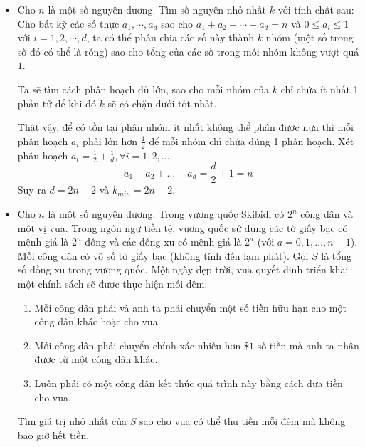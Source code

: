 \documentclass[11pt]{scrartcl}
\begin{document}
\begin{itemize}[label=, leftmargin=0em, itemsep=0.5em]
\newpage
    \item \begin{bt}
        Cho $n$ là một số nguyên dương. Tìm số nguyên nhỏ nhất $k$ với tính chất sau: Cho bất kỳ các số thực $a_1 , \cdots , a_d $ sao cho $a_1 + a_2 + \cdots + a_d = n$ và $0 \le a_i \le 1$ với $i=1,2,\cdots ,d$, ta có thể phân chia các số này thành $k$ nhóm (một số trong số đó có thể là rỗng) sao cho tổng của các số trong mỗi nhóm không vượt quá $1$.
    \end{bt}
    \begin{sol}
        Ta sẽ tìm cách phân hoạch đủ lớn, sao cho mỗi nhóm của $k$ chỉ chứa ít nhất 1 phần tử để khi đó $k$ sẽ có chặn dưới tốt nhất. 
        
        Thật vậy, để có tồn tại phân nhóm ít nhất không thể phân được nữa thì mỗi phân hoạch $a_i$ phải lớn hơn $\frac{1}{2}$ để mỗi nhóm chỉ chứa đúng 1 phân hoạch.  Xét phân hoạch $a_i = \frac{1}{2} + \frac{1}{d}, \forall i = 1,2,\dots$.
        \[
        a_1 + a_2 + \dots + a_d = \frac{d}{2} + 1 = n
        \]
        Suy ra $d = 2n - 2$ và $k_{min} = 2n - 2$.
    \end{sol}

    
    \item\begin{bt}
        Cho $n$ là một số nguyên dương. Trong vương quốc Skibidi có $2^n$ công dân và một vị vua. Trong ngôn ngữ tiền tệ, vương quốc sử dụng các tờ giấy bạc có mệnh giá là $2^n$ đồng và các đồng xu có mệnh giá là $2^a$ (với $a=0,1,\ldots,n-1$). Mỗi công dân có vô số tờ giấy bạc (không tính đến lạm phát). Gọi $S$ là tổng số đồng xu trong vương quốc. Một ngày đẹp trời, vua quyết định triển khai một chính sách sẽ được thực hiện mỗi đêm:
        \begin{enumerate}
            \item Mỗi công dân phải và anh ta phải chuyển một số tiền hữu hạn cho một công dân khác hoặc cho vua.
            \item Mỗi công dân phải chuyển chính xác nhiều hơn $\$1$ số tiền mà anh ta nhận được từ một công dân khác. 
            \item Luôn phải có một công dân kết thúc quá trình này bằng cách đưa tiền cho vua.
        \end{enumerate}

        Tìm giá trị nhỏ nhất của $S$ sao cho vua có thể thu tiền mỗi đêm mà không bao giờ hết tiền.
    \end{bt}


\end{itemize}
\end{document}
